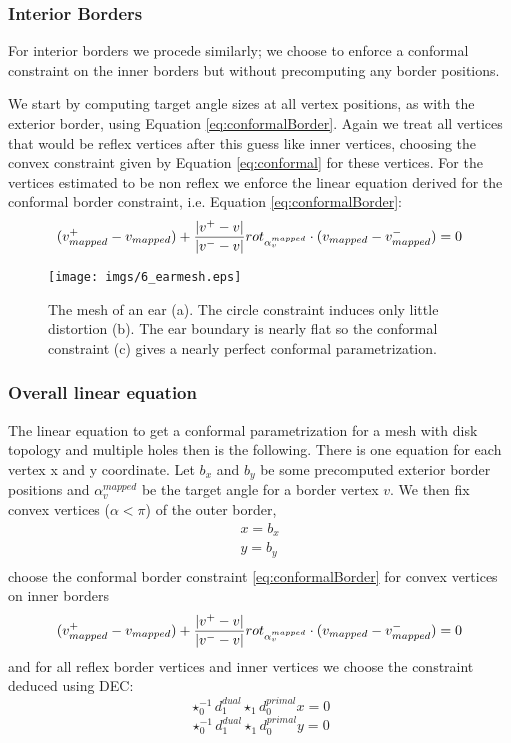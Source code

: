 \subsubsection{Interior Borders}
For interior borders we procede similarly; we choose to enforce a conformal constraint on the inner borders but without precomputing any border positions.

We start by computing target angle sizes at all vertex positions, as with the exterior border, using Equation \ref{eq:conformalBorder}. Again we treat all vertices that would be reflex vertices after this guess like inner vertices, choosing the convex constraint given by Equation \ref{eq:conformal} for these vertices.
For the vertices estimated to be non reflex we enforce the linear equation derived for the conformal border constraint, i.e. Equation \ref{eq:conformalBorder}:
\[(v^+_{mapped}-v_{mapped} ) + \frac{\left| v^+-v \right|}{\left| v^- -v \right|}rot_{\alpha_v^{mapped}} \cdot (v_{mapped} - v_{mapped}^- )= 0 \]

\begin{figure}%
\begin{center}
\texttt{[image: imgs/6\_earmesh.eps]}%
\end{center}
\caption{The mesh of an ear (a). The circle constraint induces only little distortion (b). The ear boundary is nearly flat so the conformal constraint (c) gives a nearly perfect conformal parametrization. }%
\label{fig:6_ear}%
\end{figure}

\subsubsection{Overall linear equation}
The linear equation to get a conformal parametrization for a mesh with disk topology and multiple holes then is the following.
There is one equation for each vertex x and y coordinate. Let $b_x$ and $b_y$ be some precomputed exterior border positions and $\alpha_v^{mapped}$ be the target angle for a border vertex $v$. We then fix convex vertices ($\alpha < \pi$) of the outer border,
\begin{eqnarray*}
 &x = b_x & \\
 &y = b_y &\\
\end{eqnarray*}
choose the conformal border constraint \ref{eq:conformalBorder} for convex vertices on inner borders 
\[(v^+_{mapped}-v_{mapped} ) + \frac{\left| v^+-v \right|}{\left| v^- -v \right|}rot_{\alpha_v^{mapped}} \cdot (v_{mapped} - v_{mapped}^- )= 0 \]
and for all reflex border vertices and inner vertices we choose the constraint deduced using DEC:
\[\star_0^{-1} d_1^{dual} \star_1 d_0^{primal} x = 0\]
\[\star_0^{-1} d_1^{dual} \star_1 d_0^{primal} y = 0\]



